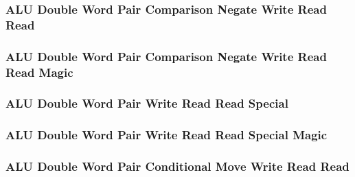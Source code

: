 

\subsubsection[{\small ALU Double Word Pair Comparison Negate Write Read Read}]{ALU Double Word Pair Comparison Negate Write Read Read} \label{sec:format-ALU-DPCNWRR}



\subsubsection[{\small ALU Double Word Pair Comparison Negate Write Read Read Magic}]{ALU Double Word Pair Comparison Negate Write Read Read Magic} \label{sec:format-ALU-DPCNWRR.M}



\subsubsection[{\small ALU Double Word Pair Write Read Read Special}]{ALU Double Word Pair Write Read Read Special} \label{sec:format-ALU-DPWRRS}



\subsubsection[{\small ALU Double Word Pair Write Read Read Special Magic}]{ALU Double Word Pair Write Read Read Special Magic} \label{sec:format-ALU-DPWRRS.M}



\subsubsection[{\small ALU Double Word Pair Conditional Move Write Read Read}]{ALU Double Word Pair Conditional Move Write Read Read} \label{sec:format-ALU-DPCMWRR}

